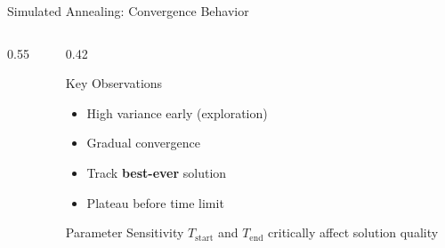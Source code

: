 \documentclass[aspectratio=169,11pt]{beamer}
\begin{document}
\begin{frame}{Simulated Annealing: Convergence Behavior}
    \begin{columns}[T]
        \begin{column}{0.55\textwidth}
            \begin{center}
            \end{center}
        \end{column}
        \begin{column}{0.42\textwidth}
            \begin{block}{Key Observations}
                \begin{itemize}
                    \item High variance early (exploration)
                    \item Gradual convergence
                    \item Track \textbf{best-ever} solution
                    \item Plateau before time limit
                \end{itemize}
            \end{block}

            \begin{alertblock}{Parameter Sensitivity}
                $T_{\text{start}}$ and $T_{\text{end}}$ critically affect solution quality
            \end{alertblock}
        \end{column}
    \end{columns}
\end{frame}
\end{document}
